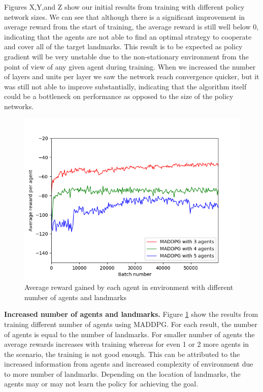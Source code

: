\documentclass{article}
\begin{document}
Figures X,Y,and Z show our initial results from training with different policy network sizes. We can see that although there is a significant improvement in average reward from the start of training, the average reward is still well below 0, indicating that the agents are not able to find an optimal strategy to cooperate and cover all of the target landmarks. This result is to be expected as policy gradient will be very unstable due to the non-stationary environment from the point of view of any given agent during training. When we increased the number of layers and units per layer we saw the network reach convergence quicker, but it was still not able to improve substantially, indicating that the algorithm itself could be a bottleneck on performance as opposed to the size of the policy networks.

\begin{figure}
\begin{center}
\includegraphics[scale=0.5]{maddpg_3,4,5agents.png}
\end{center}
\caption{Average reward gained by each agent in environment with different number of agents and landmarks}
\label{fig:avg_reward_multiple_agents}
\end{figure}

\textbf{Increased number of agents and landmarks.} Figure \ref{fig:avg_reward_multiple_agents} show the results from training different number of agents using MADDPG. For each result, the number of agents is equal to the number of landmarks. For smaller number of agents the average rewards increases with training whereas for even 1 or 2 more agents in the scenario, the training is not good enough. This can be attributed to the increased information from agents and increased complexity of environment due to more number of landmarks. Depending on the location of landmarks, the agents may or may not learn the policy for achieving the goal.   
\end{document}
